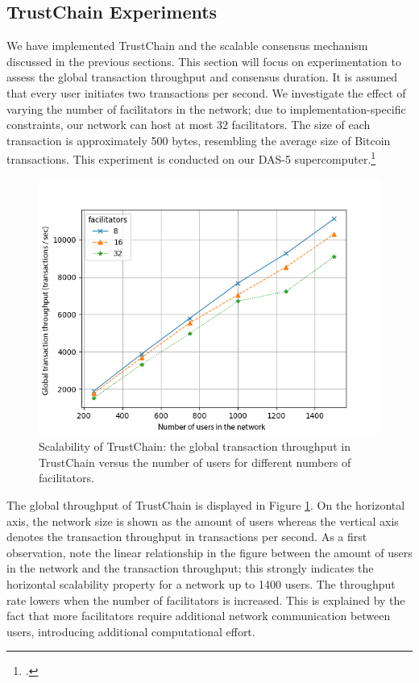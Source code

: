 \documentclass[USenglish]{article}
\begin{document}
\subsection{TrustChain Experiments}
\label{sec:trustchain_experiments}
We have implemented TrustChain and the scalable consensus mechanism discussed in the previous sections.
This section will focus on experimentation to assess the global transaction throughput and consensus duration.
It is assumed that every user initiates two transactions per second.
We investigate the effect of varying the number of facilitators in the network; due to implementation-specific constraints, our network can host at most 32 facilitators.
The size of each transaction is approximately 500 bytes, resembling the average size of Bitcoin transactions.
This experiment is conducted on our DAS-5 supercomputer.\footcite{bal2016medium}

\begin{figure}[t]
	\centering
	\includegraphics[width=0.7\columnwidth]{assets/trustchain_scalability}
	\caption{Scalability of TrustChain: the global transaction throughput in TrustChain versus the number of users for different numbers of facilitators.}
	\label{fig:trustchain_scalability_experiment}
\end{figure}

The global throughput of TrustChain is displayed in Figure \ref{fig:trustchain_scalability_experiment}.
On the horizontal axis, the network size is shown as the amount of users whereas the vertical axis denotes the transaction throughput in transactions per second.
As a first observation, note the linear relationship in the figure between the amount of users in the network and the transaction throughput; this strongly indicates the horizontal scalability property for a network up to 1400 users.
The throughput rate lowers when the number of facilitators is increased. This is explained by the fact that more facilitators require additional network communication between users, introducing additional computational effort.
\end{document}

